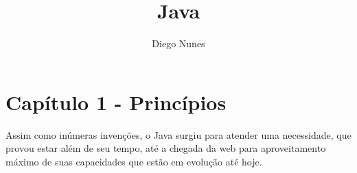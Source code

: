 \documentclass{article}
\begin{document}
\title{Java}
\author{Diego Nunes}
\maketitle
\thispagestyle{empty}

\newpage

\thispagestyle{empty} %
\tableofcontents

\setcounter{page}{1}

\newpage
\section{Capítulo 1 - Princípios}

Assim como inúmeras invenções, o Java surgiu para atender uma necessidade, que provou estar além de seu tempo, até a chegada da web para aproveitamento máximo de suas capacidades que estão em evolução até hoje. 
\end{document}
